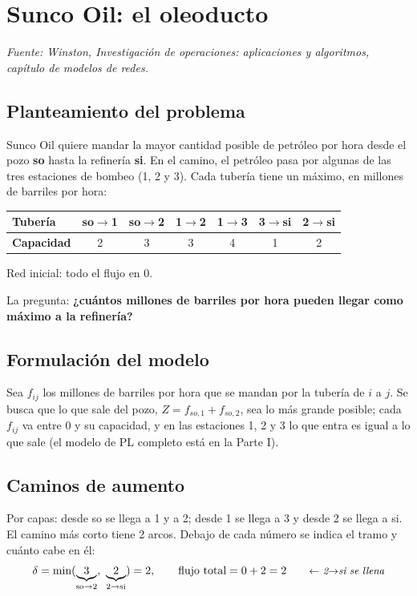 \documentclass[11pt,a4paper]{article}
\newcommand{\ar}[4][arco]{\draw[#1] (#2) to node[etq, lbl] {#4} (#3);}
\newcommand{\nodosSunco}{%
  \node[fuente]   (so) at (0,-1)   {so};
  \node[nodo]     (n1) at (1.4,0)  {1};
  \node[nodo]     (n2) at (1.4,-2) {2};
  \node[nodo]     (n3) at (2.8,0)  {3};
  \node[sumidero] (si) at (4.2,-1) {si};}
\begin{document}
\section{Sunco Oil: el oleoducto}
\textit{Fuente: Winston, Investigación de operaciones: aplicaciones y algoritmos, capítulo de modelos de redes.}

\subsection*{Planteamiento del problema}
Sunco Oil quiere mandar la mayor cantidad posible de petróleo por hora desde el pozo \textbf{so} hasta la
refinería \textbf{si}. En el camino, el petróleo pasa por algunas de las tres estaciones de bombeo (1, 2 y 3).
Cada tubería tiene un máximo, en millones de barriles por hora:

\begin{center}\small
\begin{tabular}{lcccccc}
\toprule
\textbf{Tubería} & so$\to$1 & so$\to$2 & 1$\to$2 & 1$\to$3 & 3$\to$si & 2$\to$si \\
\midrule
\textbf{Capacidad} & 2 & 3 & 3 & 4 & 1 & 2 \\
\bottomrule
\end{tabular}

\medskip
{}

Red inicial: todo el flujo en 0.
\end{center}

La pregunta: \textbf{¿cuántos millones de barriles por hora pueden llegar como máximo a la refinería?}

\subsection*{Formulación del modelo}
Sea $f_{ij}$ los millones de barriles por hora que se mandan por la tubería de $i$ a $j$. Se busca que lo que sale
del pozo, $Z = f_{so,1} + f_{so,2}$, sea lo más grande posible; cada $f_{ij}$ va entre 0 y su capacidad, y en las
estaciones 1, 2 y 3 lo que entra es igual a lo que sale (el modelo de PL completo está en la Parte I).

\subsection*{Caminos de aumento}
Por capas: desde so se llega a 1 y a 2; desde 1 se llega a 3 y desde 2 se llega a si. El camino más corto
tiene 2 arcos. Debajo de cada número se indica el tramo y cuánto cabe en él:
\[
\delta = \min(\underbrace{3}_{\text{so}\to2},\ \underbrace{2}_{2\to\text{si}}) = 2,
\qquad \text{flujo total} = 0 + 2 = 2 \nota{2$\to$si se llena}
\]
\end{document}
